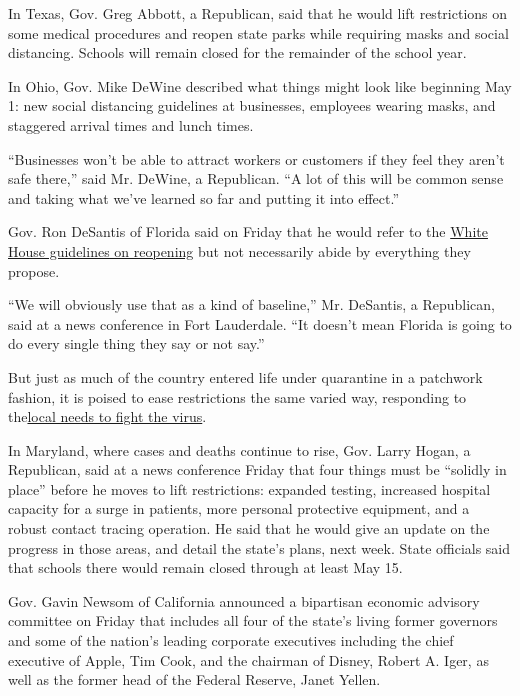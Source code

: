 In Texas, Gov. Greg Abbott, a Republican, said that he would lift
restrictions on some medical procedures and reopen state parks while
requiring masks and social distancing. Schools will remain closed for
the remainder of the school year.

In Ohio, Gov. Mike DeWine described what things might look like
beginning May 1: new social distancing guidelines at businesses,
employees wearing masks, and staggered arrival times and lunch times.

``Businesses won't be able to attract workers or customers if they feel
they aren't safe there,'' said Mr. DeWine, a Republican. ``A lot of this
will be common sense and taking what we've learned so far and putting it
into effect.''

Gov. Ron DeSantis of Florida said on Friday that he would refer to the
\href{https://www.nytimes3xbfgragh.onion/2020/04/16/us/politics/coronavirus-trump-guidelines.html}{White
House guidelines on reopening} but not necessarily abide by everything
they propose.

``We will obviously use that as a kind of baseline,'' Mr. DeSantis, a
Republican, said at a news conference in Fort Lauderdale. ``It doesn't
mean Florida is going to do every single thing they say or not say.''

But just as much of the country entered life under quarantine in a
patchwork fashion, it is poised to ease restrictions the same varied
way, responding to
the\href{https://www.nytimes3xbfgragh.onion/interactive/2020/us/coronavirus-us-cases.html\#states}{local
needs to fight the virus}.

In Maryland, where cases and deaths continue to rise, Gov. Larry Hogan,
a Republican, said at a news conference Friday that four things must be
``solidly in place'' before he moves to lift restrictions: expanded
testing, increased hospital capacity for a surge in patients, more
personal protective equipment, and a robust contact tracing operation.
He said that he would give an update on the progress in those areas, and
detail the state's plans, next week. State officials said that schools
there would remain closed through at least May 15.

Gov. Gavin Newsom of California announced a bipartisan economic advisory
committee on Friday that includes all four of the state's living former
governors and some of the nation's leading corporate executives
including the chief executive of Apple, Tim Cook, and the chairman of
Disney, Robert A. Iger, as well as the former head of the Federal
Reserve, Janet Yellen.

